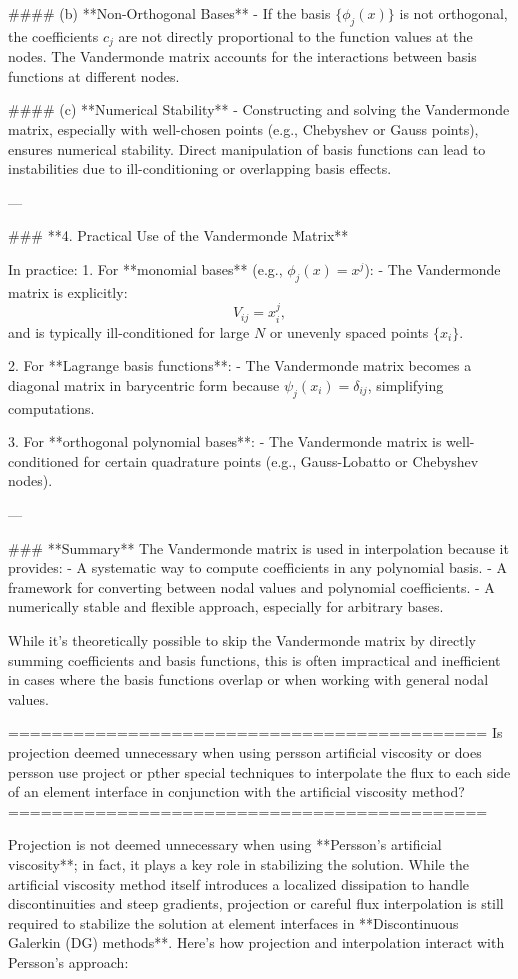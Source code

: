 #### (b) **Non-Orthogonal Bases**
- If the basis \( \{\phi_j(x)\} \) is not orthogonal, the coefficients \( c_j \) are not directly proportional to the function values at the nodes. The Vandermonde matrix accounts for the interactions between basis functions at different nodes.

#### (c) **Numerical Stability**
- Constructing and solving the Vandermonde matrix, especially with well-chosen points (e.g., Chebyshev or Gauss points), ensures numerical stability. Direct manipulation of basis functions can lead to instabilities due to ill-conditioning or overlapping basis effects.

---

### **4. Practical Use of the Vandermonde Matrix**

In practice:
1. For **monomial bases** (e.g., \( \phi_j(x) = x^j \)):
   - The Vandermonde matrix is explicitly:
     \[
     V_{ij} = x_i^j,
     \]
     and is typically ill-conditioned for large \( N \) or unevenly spaced points \( \{x_i\} \).

2. For **Lagrange basis functions**:
   - The Vandermonde matrix becomes a diagonal matrix in barycentric form because \( \psi_j(x_i) = \delta_{ij} \), simplifying computations.

3. For **orthogonal polynomial bases**:
   - The Vandermonde matrix is well-conditioned for certain quadrature points (e.g., Gauss-Lobatto or Chebyshev nodes).

---

### **Summary**
The Vandermonde matrix is used in interpolation because it provides:
- A systematic way to compute coefficients in any polynomial basis.
- A framework for converting between nodal values and polynomial coefficients.
- A numerically stable and flexible approach, especially for arbitrary bases.

While it’s theoretically possible to skip the Vandermonde matrix by directly summing coefficients and basis functions, this is often impractical and inefficient in cases where the basis functions overlap or when working with general nodal values.

============================================
Is projection deemed unnecessary when using persson artificial viscosity or does persson use project or pther special techniques to interpolate the flux to each side of an element interface in conjunction with the artificial viscosity method?
============================================

Projection is not deemed unnecessary when using **Persson's artificial viscosity**; in fact, it plays a key role in stabilizing the solution. While the artificial viscosity method itself introduces a localized dissipation to handle discontinuities and steep gradients, projection or careful flux interpolation is still required to stabilize the solution at element interfaces in **Discontinuous Galerkin (DG) methods**. Here’s how projection and interpolation interact with Persson's approach:

